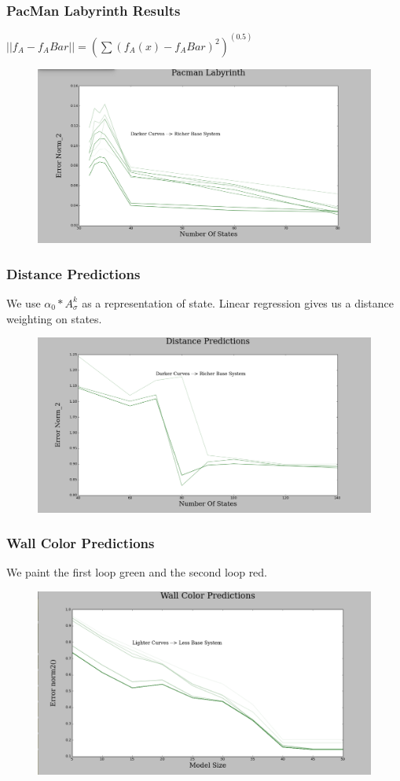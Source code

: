 \documentclass{beamer}
\begin{document}
\begin{frame}
\frametitle{PacMan Labyrinth Results}

$||f_A - f_ABar|| = (\sum (f_A(x) - f_ABar)^2)^(0.5)$ 

\begin{figure}
\includegraphics[width=0.8\linewidth]{lucasplots/monImages/PacmanLabyrinth.png}
\end{figure}
\end{frame}


\begin{frame}
\frametitle{Distance Predictions}
We use $\alpha_0*A_\sigma^k$ as a representation of state. Linear regression gives us a distance weighting on states.
\begin{figure}
\includegraphics[width=0.8\linewidth]{lucasplots/monImages/Distance_Predictions.png}
\end{figure}
\end{frame}

\begin{frame}
\frametitle{Wall Color Predictions}
We paint the first loop green and the second loop red.
\begin{figure}
\includegraphics[width=0.8\linewidth]{lucasplots/monImages/WallColorPredictions.png}
\end{figure}
\end{frame}
\end{document}

